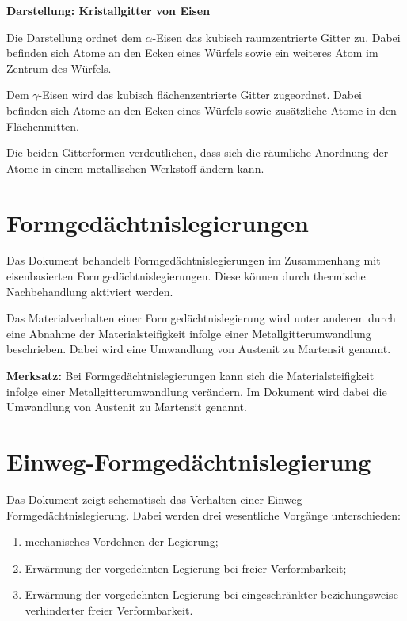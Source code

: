 \documentclass[
  12pt,
  a4paper,
  oneside
]{scrreprt}
\begin{document}
\begin{darstellungsbox}
\textbf{Darstellung: Kristallgitter von Eisen}

Die Darstellung ordnet dem $\alpha$-Eisen das kubisch raumzentrierte
Gitter zu. Dabei befinden sich Atome an den Ecken eines Würfels sowie
ein weiteres Atom im Zentrum des Würfels.

Dem $\gamma$-Eisen wird das kubisch flächenzentrierte Gitter
zugeordnet. Dabei befinden sich Atome an den Ecken eines Würfels sowie
zusätzliche Atome in den Flächenmitten.

Die beiden Gitterformen verdeutlichen, dass sich die räumliche
Anordnung der Atome in einem metallischen Werkstoff ändern kann.
\end{darstellungsbox}

\section{Formgedächtnislegierungen}

Das Dokument behandelt Formgedächtnislegierungen im Zusammenhang mit
eisenbasierten Formgedächtnislegierungen. Diese können durch thermische
Nachbehandlung aktiviert werden. 

Das Materialverhalten einer Formgedächtnislegierung wird unter anderem
durch eine Abnahme der Materialsteifigkeit infolge einer
Metallgitterumwandlung beschrieben. Dabei wird eine Umwandlung von
Austenit zu Martensit genannt. 

\begin{merksatzbox}
\textbf{Merksatz:}
Bei Formgedächtnislegierungen kann sich die Materialsteifigkeit infolge
einer Metallgitterumwandlung verändern. Im Dokument wird dabei die
Umwandlung von Austenit zu Martensit genannt.

\end{merksatzbox}

\section{Einweg-Formgedächtnislegierung}

Das Dokument zeigt schematisch das Verhalten einer
Einweg-Formgedächtnislegierung. Dabei werden drei wesentliche Vorgänge
unterschieden:

\begin{enumerate}
  \item mechanisches Vordehnen der Legierung;
  \item Erwärmung der vorgedehnten Legierung bei freier
  Verformbarkeit;
  \item Erwärmung der vorgedehnten Legierung bei eingeschränkter
  beziehungsweise verhinderter freier Verformbarkeit.
\end{enumerate}
\end{document}

